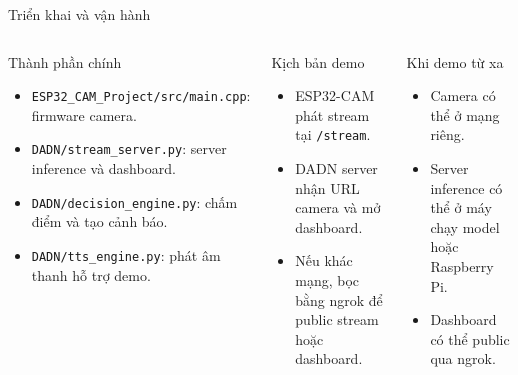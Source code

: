 \documentclass[aspectratio=169]{beamer}
\begin{document}
\begin{frame}{Triển khai và vận hành}
  \footnotesize
  \begin{columns}[T,onlytextwidth]
    \begin{block}{Thành phần chính}
      \begin{itemize}
        \item \texttt{ESP32\_CAM\_Project/src/main.cpp}: firmware camera.
        \item \texttt{DADN/stream\_server.py}: server inference và dashboard.
        \item \texttt{DADN/decision\_engine.py}: chấm điểm và tạo cảnh báo.
        \item \texttt{DADN/tts\_engine.py}: phát âm thanh hỗ trợ demo.
      \end{itemize}
    \end{block}
    \vspace{-0.2em}
    \begin{block}{Kịch bản demo}
      \begin{itemize}
        \item ESP32-CAM phát stream tại \texttt{/stream}.
        \item DADN server nhận URL camera và mở dashboard.
        \item Nếu khác mạng, bọc bằng ngrok để public stream hoặc dashboard.
      \end{itemize}
    \end{block}
    \begin{block}{Khi demo từ xa}
      \begin{itemize}
        \item Camera có thể ở mạng riêng.
        \item Server inference có thể ở máy chạy model hoặc Raspberry Pi.
        \item Dashboard có thể public qua ngrok.
      \end{itemize}
    \end{block}
  \end{columns}
\end{frame}
\end{document}
